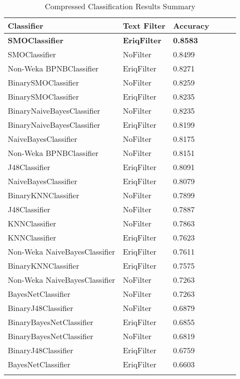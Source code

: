 \begin{center}
   \begin{longtable}{|l|l|l|c|c|c|}
      \hline
         Classifier & Text Filter & Accuracy
      \tabularnewline\hline
         \textbf{SMOClassifier} & \textbf{EriqFilter} & \textbf{0.8583}
      \tabularnewline\hline
         SMOClassifier & NoFilter & 0.8499
      \tabularnewline\hline
         Non-Weka BPNBClassifier & EriqFilter & 0.8271
      \tabularnewline\hline
         BinarySMOClassifier & NoFilter & 0.8259
      \tabularnewline\hline
         BinarySMOClassifier & EriqFilter & 0.8235
      \tabularnewline\hline
         BinaryNaiveBayesClassifier & NoFilter & 0.8235
      \tabularnewline\hline
         BinaryNaiveBayesClassifier & EriqFilter & 0.8199
      \tabularnewline\hline
         NaiveBayesClassifier & NoFilter & 0.8175
      \tabularnewline\hline
         Non-Weka BPNBClassifier & NoFilter & 0.8151
      \tabularnewline\hline
         J48Classifier & EriqFilter & 0.8091
      \tabularnewline\hline
         NaiveBayesClassifier & EriqFilter & 0.8079
      \tabularnewline\hline
         BinaryKNNClassifier & NoFilter & 0.7899
      \tabularnewline\hline
         J48Classifier & NoFilter & 0.7887
      \tabularnewline\hline
         KNNClassifier & NoFilter & 0.7863
      \tabularnewline\hline
         KNNClassifier & EriqFilter & 0.7623
      \tabularnewline\hline
         Non-Weka NaiveBayesClassifier & EriqFilter & 0.7611
      \tabularnewline\hline
         BinaryKNNClassifier & EriqFilter & 0.7575
      \tabularnewline\hline
         Non-Weka NaiveBayesClassifier & NoFilter & 0.7263
      \tabularnewline\hline
         BayesNetClassifier & NoFilter & 0.7263
      \tabularnewline\hline
         BinaryJ48Classifier & NoFilter & 0.6879
      \tabularnewline\hline
         BinaryBayesNetClassifier & EriqFilter & 0.6855
      \tabularnewline\hline
         BinaryBayesNetClassifier & NoFilter & 0.6819
      \tabularnewline\hline
         BinaryJ48Classifier & EriqFilter & 0.6759
      \tabularnewline\hline
         BayesNetClassifier & EriqFilter & 0.6603
      \tabularnewline\hline
      \caption[Compressed Classification Results Summary]{Compressed Classification Results Summary}
      \label{table:classification-summary-compressed}
   \end{longtable}
\end{center}

